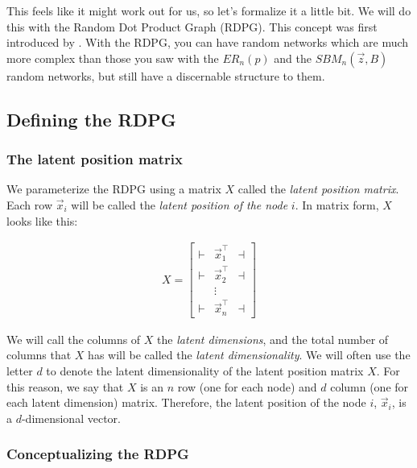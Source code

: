 This feels like it might work out for us, so let's formalize it a little bit. We will do this with the Random Dot Product Graph (RDPG). This concept was first introduced by \cite{Young2007}. With the RDPG, you can have random networks which are much more complex than those you saw with the $ER_n(p)$ and the $SBM_n(\vec z, B)$ random networks, but {still} have a discernable structure to them.

\subsection{Defining the RDPG}

\subsubsection{The latent position matrix}

We parameterize the RDPG using a matrix $X$ called the \textit{latent position matrix}. Each row $\vec x_i$ will be called the \textit{latent position of the node} $i$. In matrix form, $X$ looks like this:

\begin{align*}
 X = \begin{bmatrix}
     \vdash & \vec x_1^\top & \dashv \\
     \vdash & \vec x_2^\top & \dashv \\
     & \vdots & \\
     \vdash & \vec x_n^\top & \dashv
 \end{bmatrix}
\end{align*}

We will call the columns of $X$ the \textit{latent dimensions}, and the total number of columns that $X$ has will be called the \textit{latent dimensionality}. We will often use the letter $d$ to denote the latent dimensionality of the latent position matrix $X$. For this reason, we say that $X$ is an $n$ row (one for each node) and $d$ column (one for each latent dimension) matrix. Therefore, the latent position of the node $i$, $\vec x_i$, is a $d$-dimensional vector. 


\subsubsection{Conceptualizing the RDPG}

